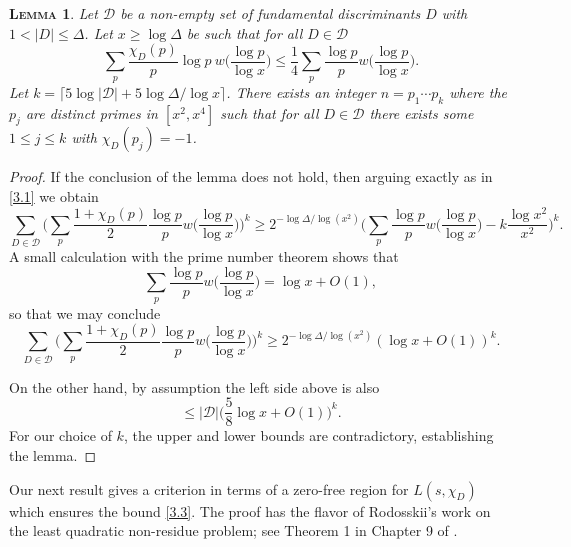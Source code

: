 \documentclass[11pt,makeidx, reqno]{amsart}
\theoremstyle{mystyle}
\newtheorem{lemma}[theorem]{\textsc{Lemma}}
\theoremstyle{definition}
\begin{document}
\begin{lemma} \label{lem3.1}  Let ${\mathcal D}$ be a non-empty set of fundamental discriminants $D$ with $1 <|D|\le \Delta$.   Let $x\ge \log \Delta$ be such that for all $D\in {\mathcal D}$
\begin{equation}\label{3.3}
\sum_{p} \frac{\chi_D(p)}{p} \log p\  w\Big(\frac{\log p}{\log x} \Big) 
\le \frac 14 \sum_p \frac{\log p}{p} w \Big(\frac{\log p}{\log x}\Big). 
\end{equation}
Let $k= \lceil 5 \log |{\mathcal D}| + 5 \log \Delta/\log x\rceil$.   There exists an integer $n=p_1 \cdots p_k$ where the $p_j$ are distinct primes in $[x^2,x^4]$ such that for all $D\in {\mathcal D}$ there exists some $1\le j\le k$ with $\chi_D(p_j)=-1$. 
\end{lemma} 
\begin{proof} If the conclusion of the lemma does not hold, then arguing exactly as in \eqref{3.1} we obtain 
$$ 
\sum_{D\in {\mathcal D}} \Big( \sum_p \frac{1+\chi_D(p)}{2}
\frac{\log p}{p} w\Big(\frac{\log p}{\log x}\Big) \Big)^k
\ge 2^{-\log \Delta/\log (x^2)} \Big( 
\sum_p \frac{\log p}{p} w\Big(\frac{\log p}{\log x}\Big)  - k\frac{\log x^2}{x^2}\Big)^k. 
$$
A small calculation with the prime number theorem shows that 
\begin{equation}\label{3.4}
\sum_p \frac{\log p}{p} w\Big(\frac{\log p}{\log x}\Big) = \log x + O(1), 
\end{equation}
so that we may conclude 
$$ 
\sum_{D\in {\mathcal D}} \Big( \sum_p \frac{1+\chi_D(p)}{2} 
\frac{\log p}{p} w\Big(\frac{\log p}{\log x}\Big) \Big)^k
\ge 2^{-\log \Delta/\log (x^2)} ( \log x + O(1))^k.  
$$

On the other hand, by assumption the left side above is also 
$$
\le |{\mathcal D}| \Big( \frac 58 \log x + O(1)\Big)^k. 
$$
For our choice of $k$, the upper and lower bounds are contradictory, establishing the lemma.
\end{proof} 


 Our next result gives a criterion in terms of a zero-free region for $L(s,\chi_{D})$ which ensures the bound \eqref{3.3}.  The proof has the flavor of Rodosskii's work on the least quadratic non-residue problem; see Theorem 1 in Chapter 9 of \cite{montgomeryTen}.
\end{document}
